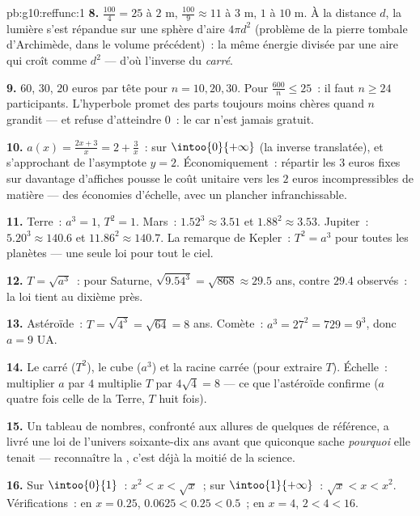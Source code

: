 \begin{solution}{pb:g10:reffunc:1}
\textbf{8.} $\frac{100}{4} = 25$ à $2$ m,
$\frac{100}{9} \approx 11$ à $3$ m, $1$ à $10$ m. À la distance $d$,
la lumière s'est répandue sur une sphère d'aire $4\pi d^2$ (problème
de la pierre tombale d'Archimède, dans le volume précédent)~: la même
énergie divisée par une aire qui croît comme $d^2$ --- d'où l'inverse
du \emph{carré}.

\textbf{9.} $60$, $30$, $20$ euros par tête pour $n = 10, 20, 30$.
Pour $\frac{600}{n} \leq 25$~: il faut $n \geq 24$ participants.
L'hyperbole promet des parts toujours moins chères quand $n$ grandit
--- et refuse d'atteindre $0$~: le car n'est jamais gratuit.

\textbf{10.} $a(x) = \frac{2x + 3}{x} = 2 + \frac3x$~: 
sur $\intoo{0}{+\infty}$ (la  inverse translatée), et
s'approchant de l'asymptote $y = 2$. Économiquement~: répartir les
$3$ euros fixes sur davantage d'affiches pousse le coût unitaire vers
les $2$ euros incompressibles de matière --- des économies d'échelle,
avec un plancher infranchissable.

\textbf{11.} Terre~: $a^3 = 1$, $T^2 = 1$. Mars~:
$1.52^3 \approx 3.51$ et $1.88^2 \approx 3.53$. Jupiter~:
$5.20^3 \approx 140.6$ et $11.86^2 \approx 140.7$. La remarque de
Kepler~: $T^2 = a^3$ pour toutes les planètes --- une seule loi pour
tout le ciel.

\textbf{12.} $T = \sqrt{a^3}$~: pour Saturne,
$\sqrt{9.54^3} = \sqrt{868} \approx 29.5$ ans, contre $29.4$
observés~: la loi tient au dixième près.

\textbf{13.} Astéroïde~: $T = \sqrt{4^3} = \sqrt{64} = 8$ ans.
Comète~: $a^3 = 27^2 = 729 = 9^3$, donc $a = 9$ UA.

\textbf{14.} Le carré ($T^2$), le cube ($a^3$) et la racine carrée
(pour extraire $T$). Échelle~: multiplier $a$ par $4$ multiplie $T$
par $4\sqrt4 = 8$ --- ce que l'astéroïde confirme ($a$ quatre fois
celle de la Terre, $T$ huit fois).

\textbf{15.} Un tableau de nombres, confronté aux allures de quelques
 de référence, a livré une loi de l'univers soixante-dix ans
avant que quiconque sache \emph{pourquoi} elle tenait --- reconnaître
la , c'est déjà la moitié de la science.

\textbf{16.} Sur $\intoo{0}{1}$~: $x^2 < x < \sqrt x$~; sur
$\intoo{1}{+\infty}$~: $\sqrt x < x < x^2$. Vérifications~: en
$x = 0.25$, $0.0625 < 0.25 < 0.5$~; en $x = 4$, $2 < 4 < 16$.


\end{solution}
